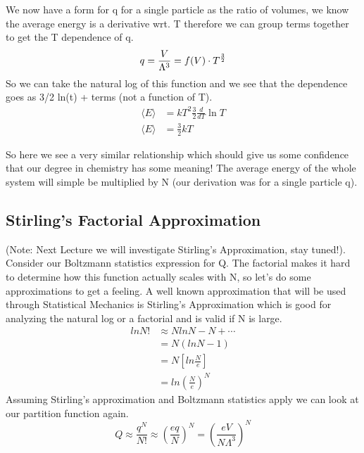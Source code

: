 \documentclass{article}
\begin{document}
 We now have a form for q for a single particle as the ratio of volumes, we know the average energy is a derivative wrt. T therefore we can group terms together to get the T dependence of q. 
 \begin{equation}
      q = \frac{V}{\Lambda^3} = f(V) \cdot T^{\frac{3}{2}}\\
      \end{equation}
So we can take the natural log of this function and we see that the dependence goes as 3/2 ln(t) + terms (not a function of T). 
\begin{equation}
\begin{split}
     \langle E \rangle &= kT^2 \frac{3}{2} \frac{d}{dT} \ln T\\
     \langle E \rangle &= \frac{3}{2} kT
        \end{split}
\end{equation}

 So here we see a very similar relationship which should give us some confidence that our degree in chemistry has some meaning!
 The average energy of the whole system will simple be multiplied by N (our derivation was for a single particle q). 
 
 \subsection*{Stirling's Factorial Approximation}
 (Note: Next Lecture we will investigate Stirling's Approximation, stay tuned!).\\
 Consider our Boltzmann statistics expression for Q. 
 The factorial makes it hard to determine how this function actually scales with N, so let's do some approximations to get a feeling. 
 A well known approximation that will be used through Statistical Mechanics is Stirling's Approximation which is good for analyzing the natural log or a factorial and is valid if N is large. 
 \begin{equation}
 \begin{split}
      ln N! &\approx N ln N - N + \cdots \\
      &= N(ln N -1)\\
      &= N\left[ln\frac{N}{e}\right] \\
      &= ln \left(\frac{N}{e}\right)^N
 \end{split}
 \end{equation}
Assuming Stirling's approximation and Boltzmann statistics apply we can look at our partition function again. 
\begin{equation}
 Q \approx \frac{q^N}{N!} \approx \left (\frac{eq}{N}\right )^N = \left (\frac{eV}{N\Lambda^3}\right )^N
\end{equation}
 
\end{document}
